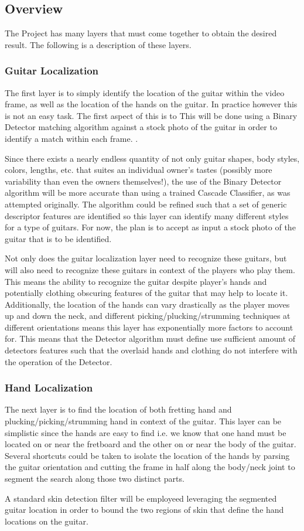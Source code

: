 \subsection{Overview}
The \project Project has many layers that must come together to obtain the desired result.
The following is a description of these layers.
\subsubsection{Guitar Localization}
The first layer is to simply identify the location of the guitar within the video frame,
as well as the location of the hands on the guitar.
In practice however this is not an easy task.
The first aspect of this is to 
This will be done using a Binary Detector matching algorithm against a stock photo of the guitar
in order to identify a match within each frame. \cite{opencv}.
\par
Since there exists a nearly endless quantity of not only guitar shapes, body styles, colors, lengths, etc.
that suites an individual owner's tastes (possibly more variability than even the owners themselves!),
the use of the Binary Detector algorithm will be more accurate than using a trained Cascade Classifier,
as was attempted originally.
The algorithm could be refined such that a set of generic descriptor features are identified so
this layer can identify many different styles for a type of guitars.
For now, the plan is to accept as input a stock photo of the guitar that is to be identified.
\par
Not only does the guitar localization layer need to recognize these guitars,
but will also need to recognize these guitars in context of the players who play them.
This means the ability to recognize the guitar despite player's hands and potentially clothing obscuring
features of the guitar that may help to locate it.
Additionally, the location of the hands can vary drastically as the player moves up and down the neck,
and different picking/plucking/strumming techniques at different orientations
means this layer has exponentially more factors to account for.
This means that the Detector algorithm must define use sufficient amount of detectors features
such that the overlaid hands and clothing do not interfere with the operation of the Detector.

\subsubsection{Hand Localization}
The next layer is to find the location of both fretting hand and plucking/picking/strumming hand in context of the guitar.
This layer can be simplistic since the hands are easy to find
i.e. we know that one hand must be located on or near the fretboard and the other on or near the body of the guitar.
Several shortcuts could be taken to isolate the location of the hands by parsing the guitar orientation
and cutting the frame in half along the body/neck joint to segment the search along those two distinct parts.
\par
A standard skin detection filter will be employeed leveraging the segmented guitar location in order to bound
the two regions of skin that define the hand locations on the guitar.


